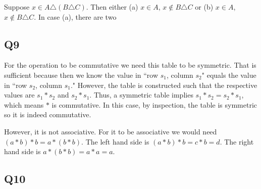 \documentclass[12pt]{article}
\numberwithin{theorem}{section}
\numberwithin{equation}{section}
\numberwithin{remark}{section}
\numberwithin{definition}{section}
\numberwithin{theorem}{section}
\numberwithin{lemma}{section}
\numberwithin{example}{section}
\begin{document}
Suppose $x \in A \triangle (B \triangle C)$. Then either (a) $x\in A$, $x \notin B \triangle C$ or (b) $x\in A$, $x \notin B \triangle C$. In case (a), there are two 



\subsection{Q9}

For the operation to be commutative we need this table to be symmetric. That is sufficient because then we know the value in ``row $s_1$, column $s_2$" equals the value in ``row $s_2$, column $s_1$." However, the table is constructed such that the respective values are $s_1 * s_2$ and $s_2 * s_1$. Thus, a symmetric table implies $s_1*s_2=s_2*s_1$, which means $*$ is commutative. In this case, by inspection, the table is symmetric so it is indeed commutative. 

However, it is not associative. For it to be associative we would need $(a*b)*b=a*(b*b)$. The left hand side is $(a*b)*b=c*b=d$. The right hand side is $a*(b*b)=a*a=a$. 



\subsection{Q10}
\end{document}
